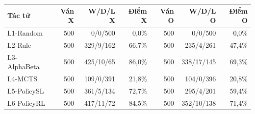 \begin{center}\small
\begin{tabular}{@{}lrrrrrr@{}}
\toprule
Tác tử & Ván X & W/D/L X & Điểm X & Ván O & W/D/L O & Điểm O \\
\midrule
L1-Random & 500 & 0/0/500 & 0,0\% & 500 & 0/0/500 & 0,0\% \\
L2-Rule & 500 & 329/9/162 & 66,7\% & 500 & 235/4/261 & 47,4\% \\
L3-AlphaBeta & 500 & 425/10/65 & 86,0\% & 500 & 338/17/145 & 69,3\% \\
L4-MCTS & 500 & 109/0/391 & 21,8\% & 500 & 104/0/396 & 20,8\% \\
L5-PolicySL & 500 & 361/5/134 & 72,7\% & 500 & 295/4/201 & 59,4\% \\
L6-PolicyRL & 500 & 417/11/72 & 84,5\% & 500 & 352/10/138 & 71,4\% \\
\bottomrule
\end{tabular}
\end{center}